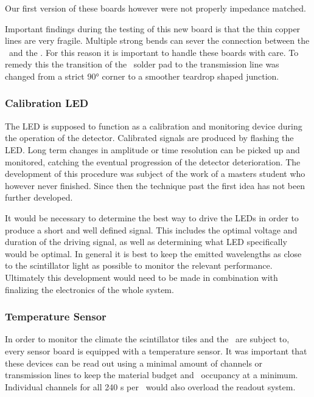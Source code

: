 \documentclass[../BTOF_summary.tex]{subfiles}
\begin{document}
Our first version of these boards however were not properly impedance matched.

Important findings during the testing of this new board is that the thin copper lines are very fragile.
Multiple strong bends can sever the connection between the \sipms\ and the \railboard .
For this reason it is important to handle these boards with care.
To remedy this the transition of the \sipm\ solder pad to the transmission line was changed from a strict \ang{90} corner to a smoother teardrop shaped junction.

\subsubsection*{Calibration LED}
The LED is supposed to function as a calibration and monitoring device during the operation of the detector.
Calibrated signals are produced by flashing the LED.
Long term changes in amplitude or time resolution can be picked up and monitored, catching the eventual progression of the detector deterioration.
The development of this procedure was subject of the work of a masters student who however never finished.
Since then the technique past the first idea has not been further developed.

It would be necessary to determine the best way to drive the LEDs in order to produce a short and well defined signal. 
This includes the optimal voltage and duration of the driving signal, as well as determining what LED specifically would be optimal.
In general it is best to keep the emitted wavelengths as close to the scintillator light as possible to monitor the relevant performance.
Ultimately this development would need to be made in combination with finalizing the electronics of the whole system.

\subsubsection*{Temperature Sensor}
In order to monitor the climate the scintillator tiles and the \sipms\ are subject to, every sensor board is equipped with a temperature sensor. It was important that these devices can be read out using a minimal amount of channels or transmission lines to keep the material budget and \railboard\ occupancy at a minimum.
Individual channels for all 240 \sensorboard s per \sm\ would also overload the readout system.
\end{document}
